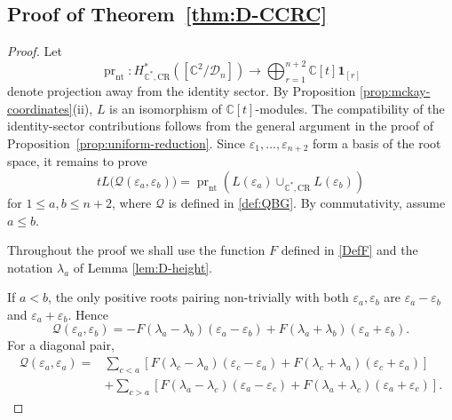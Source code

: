 \documentclass[a4paper,reqno]{amsart}
\theoremstyle{plain} %
\theoremstyle{definition} %
\theoremstyle{remark} %
\newcommand{\cD}{{\mathcal D}}
\newcommand{\1}{\mathds{1}}   %
\begin{document}
\subsection{Proof of Theorem~\ref{thm:D-CCRC}}

\begin{proof}
Let
\[
\operatorname{pr}_{\mathrm{nt}}:
H^*_{\mathbb C^*,\mathrm{CR}}([\mathbb C^2/\cD_n])
\longrightarrow
\bigoplus_{r=1}^{n+2}\mathbb C[t]\mathbf1_{[r]}
\]
denote projection away from the identity sector. 
By Proposition \ref{prop:mckay-coordinates}(ii), \(L\) is an isomorphism of \(\mathbb C[t]\)-modules. 
The compatibility of the identity-sector contributions follows from the general argument in the proof of 
Proposition~\ref{prop:uniform-reduction}. 
Since \(\varepsilon_1,\ldots,\varepsilon_{n+2}\) form a basis of the root space, it remains to prove
\begin{equation}\label{eq:D-multiplicativity}
tL\bigl(\mathcal Q(\varepsilon_a,\varepsilon_b)\bigr)
=
\operatorname{pr}_{\mathrm{nt}}\!\left(
L(\varepsilon_a)\cup_{\mathbb C^*,\mathrm{CR}}L(\varepsilon_b)
\right)
\end{equation}
for \(1\le a,b\le n+2\), where $\mathcal{Q}$ is defined in \eqref{def:QBG}.  
By commutativity, assume \(a\le b\).

Throughout the proof we shall use the function $F$ defined in \eqref{DefF} and the notation $\lambda_a$
of Lemma \ref{lem:D-height}.


If \(a<b\), the only positive roots pairing non-trivially with both
\(\varepsilon_a,\varepsilon_b\) are
\(\varepsilon_a-\varepsilon_b\) and \(\varepsilon_a+\varepsilon_b\). Hence
\begin{equation}\label{eq:D-offdiag}
\mathcal Q(\varepsilon_a,\varepsilon_b)
=
-F(\lambda_a-\lambda_b)(\varepsilon_a-\varepsilon_b)
+F(\lambda_a+\lambda_b)(\varepsilon_a+\varepsilon_b).
\end{equation}
For a diagonal pair,
\begin{align}
\mathcal Q(\varepsilon_a,\varepsilon_a)
={}&
\sum_{c<a}
\left[
F(\lambda_c-\lambda_a)(\varepsilon_c-\varepsilon_a)
+F(\lambda_c+\lambda_a)(\varepsilon_c+\varepsilon_a)
\right]
\nonumber\\
&+
\sum_{c>a}
\left[
F(\lambda_a-\lambda_c)(\varepsilon_a-\varepsilon_c)
+F(\lambda_a+\lambda_c)(\varepsilon_a+\varepsilon_c)
\right].
\label{eq:D-diagonal}
\end{align}


\end{proof}
\end{document}

